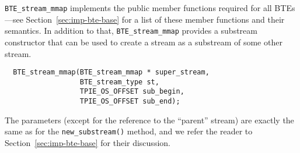 \lstinline|BTE_stream_mmap| implements the public member functions
required for all BTEs---see Section~\ref{sec:imp-bte-base} for a list
of these member functions and their semantics. In addition to that,
\lstinline|BTE_stream_mmap| provides a substream constructor that can
be used to create a stream as a substream of some other stream. 
\begin{lstlisting}
  BTE_stream_mmap(BTE_stream_mmap * super_stream,
                  BTE_stream_type st, 
                  TPIE_OS_OFFSET sub_begin, 
                  TPIE_OS_OFFSET sub_end);
\end{lstlisting}

The parameters (except for the reference to the ``parent'' stream) are
exactly the same as for the \lstinline|new_substream()| method, and
we refer the reader to Section~\ref{sec:imp-bte-base} for their
discussion.

  



